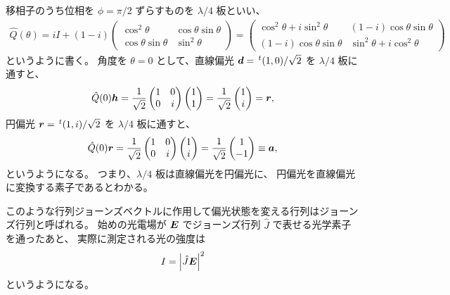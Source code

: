 \documentclass[9pt,dvipdfmx,a4paper]{jsarticle}
\begin{document}
移相子のうち位相を \(\phi = \pi/2\) ずらすものを \(\lambda/4\) 板といい、
\begin{align}
    \hat{Q}(\theta)
    =iI + (1-i)\begin{pmatrix}
        \cos^2 \theta & \cos\theta\sin\theta\\
        \cos\theta\sin\theta & \sin^2\theta
    \end{pmatrix}
    =\begin{pmatrix}
        \cos^2\theta+i\sin^2\theta & (1-i)\cos\theta\sin\theta\\
        (1-i)\cos\theta\sin\theta & \sin^2\theta + i \cos^2\theta
    \end{pmatrix}
\end{align}
というように書く。
角度を \(\theta = 0\) として、直線偏光 \(\vb*{d}=\,^t(1,0)/\sqrt{2}\) を \(\lambda/4\) 板に通すと、
\begin{align}
    \hat{Q}(0)\vb*{h} =\frac{1}{\sqrt{2}}
    \begin{pmatrix}
        1   &   0\\
        0   &   i
    \end{pmatrix}
    \begin{pmatrix}
        1 \\ 1
    \end{pmatrix}
    = \frac{1}{\sqrt{2}}\begin{pmatrix}
        1 \\ i
    \end{pmatrix}
    =\vb*{r},
\end{align}
円偏光 \(\vb*{r} = \,^t(1,i)/\sqrt{2}\) を \(\lambda/4\) 板に通すと、
\begin{align}
    \hat{Q}(0)\vb*{r} = \frac{1}{\sqrt{2}}
    \begin{pmatrix}
        1   &   0\\
        0   &   i
    \end{pmatrix}
    \begin{pmatrix}
        1 \\ i
    \end{pmatrix}
    = \frac{1}{\sqrt{2}}\begin{pmatrix}
        1 \\ -1
    \end{pmatrix}
    \equiv\vb*{a},
\end{align}
というようになる。
つまり、\(\lambda/4\) 板は直線偏光を円偏光に、
円偏光を直線偏光に変換する素子であるとわかる。

このような行列ジョーンズベクトルに作用して偏光状態を変える行列はジョーンズ行列と呼ばれる。
始めの光電場が \(\vb*{E}\) でジョーンズ行列 \(\hat{J}\) で表せる光学素子を通ったあと、
実際に測定される光の強度は
\begin{align}
    I = \abs{\hat{J}\vb*{E}}^2
\end{align}
というようになる。
\end{document}
